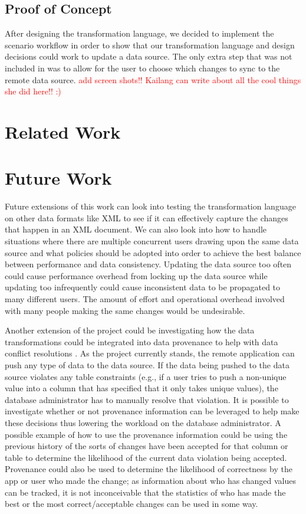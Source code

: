 \documentclass[12pt]{article}
\begin{document}
\subsection{Proof of Concept}
After designing the transformation language, we decided to implement the scenario workflow in order to show that our transformation language and design decisions could work to update a data source. The only extra step that was not included in \cite{arniThesis} was to allow for the user to choose which changes to sync to the remote data source. \textcolor{red}{add screen shots!! Kailang can write about all the cool things she did here!! :)}

\section{Related Work}

\section{Future Work}
Future extensions of this work can look into testing the transformation language on other data formats like XML to see if it can effectively capture the changes that happen in an XML document. We can also look into how to handle situations where there are multiple concurrent users drawing upon the same data source and what policies should be adopted into order to achieve the best balance between performance and data consistency. Updating the data source too often could cause performance overhead from locking up the data source while updating too infrequently could cause inconsistent data to be propagated to many different users. The amount of effort and operational overhead involved with many people making the same changes would be undesirable. 

Another extension of the project could be investigating how the data transformations could be integrated into data provenance to help with data conflict resolutions \cite{arniThesis}. As the project currently stands, the remote application can push any type of data to the data source. If the data being pushed to the data source violates any table constraints (e.g., if a user tries to push a non-unique value into a column that has specified that it only takes unique values), the database administrator has to manually resolve that violation. It is possible to investigate whether or not provenance information can be leveraged to help make these decisions thus lowering the workload on the database administrator. A possible example of how to use the provenance information could be using the previous history of the sorts of changes have been accepted for that column or table to determine the likelihood of the current data violation being accepted. Provenance could also be used to determine the likelihood of correctness by the app or user who made the change; as information about who has changed values can be tracked, it is not inconceivable that the statistics of who has made the best or the most correct/acceptable changes can be used in some way.



\end{document}
